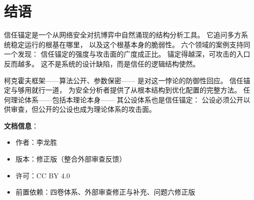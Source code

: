 \documentclass[11pt,a4paper]{article}
\begin{document}
\section{结语}

信任锚定是一个从网络安全对抗博弈中自然涌现的结构分析工具。
它追问多方系统稳定运行的根基在哪里，
以及这个根基本身的脆弱性。
六个领域的案例支持同一个发现：
信任锚定的强度与攻击面的广度成正比。
锚定得越深，可攻击的入口反而越多。
这不是系统的设计缺陷，而是信任的逻辑结构使然。

柯克霍夫框架——算法公开、参数保密——
是对这一悖论的防御性回应。
信任锚定与够用就行一道，
为安全分析者提供了从根本结构到优化配置的完整方法。
任何理论体系——包括本理论本身——
其公设体系也是信任锚定：
公设必须公开以供审查，但公开的公设也成为理论体系的攻击面。

\vspace{5mm}
\noindent\textbf{文档信息}：
\begin{itemize}
    \item 作者：李龙胜
    \item 版本：修正版（整合外部审查反馈）
    \item 许可：CC BY 4.0
    \item 前置依赖：四卷体系、外部审查修正与补充、问题六修正版
\end{itemize}
\end{document}

